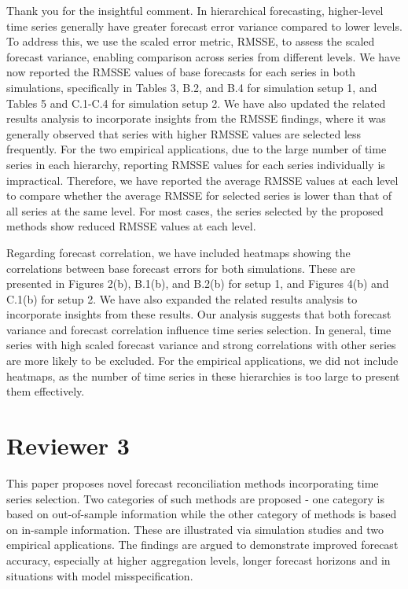 \documentclass[11pt,a4paper,]{article}
\renewenvironment{quote}
               {\list{}{\rightmargin\leftmargin}%
                \item\relax\color[RGB]{0,150,0}}
               {\endlist}
\begin{document}
\begin{quote}
Thank you for the insightful comment. In hierarchical forecasting,
higher-level time series generally have greater forecast error variance
compared to lower levels. To address this, we use the scaled error
metric, RMSSE, to assess the scaled forecast variance, enabling
comparison across series from different levels. We have now reported the
RMSSE values of base forecasts for each series in both simulations,
specifically in Tables 3, B.2, and B.4 for simulation setup 1, and
Tables 5 and C.1-C.4 for simulation setup 2. We have also updated the
related results analysis to incorporate insights from the RMSSE
findings, where it was generally observed that series with higher RMSSE
values are selected less frequently. For the two empirical applications,
due to the large number of time series in each hierarchy, reporting
RMSSE values for each series individually is impractical. Therefore, we
have reported the average RMSSE values at each level to compare whether
the average RMSSE for selected series is lower than that of all series
at the same level. For most cases, the series selected by the proposed
methods show reduced RMSSE values at each level.

Regarding forecast correlation, we have included heatmaps showing the
correlations between base forecast errors for both simulations. These
are presented in Figures 2(b), B.1(b), and B.2(b) for setup 1, and
Figures 4(b) and C.1(b) for setup 2. We have also expanded the related
results analysis to incorporate insights from these results. Our
analysis suggests that both forecast variance and forecast correlation
influence time series selection. In general, time series with high
scaled forecast
variance
and strong correlations with other series are more likely to be
excluded. For the empirical applications, we did not include heatmaps,
as the number of time series in these hierarchies is too large to
present them effectively.
\end{quote}

\section*{Reviewer 3}\label{reviewer-3}

This paper proposes novel forecast reconciliation methods incorporating
time series selection. Two categories of such methods are proposed - one
category is based on out-of-sample information while the other category
of methods is based on in-sample information. These are illustrated via
simulation studies and two empirical applications. The findings are
argued to demonstrate improved forecast accuracy, especially at higher
aggregation levels, longer forecast horizons and in situations with
model misspecification.
\end{document}
